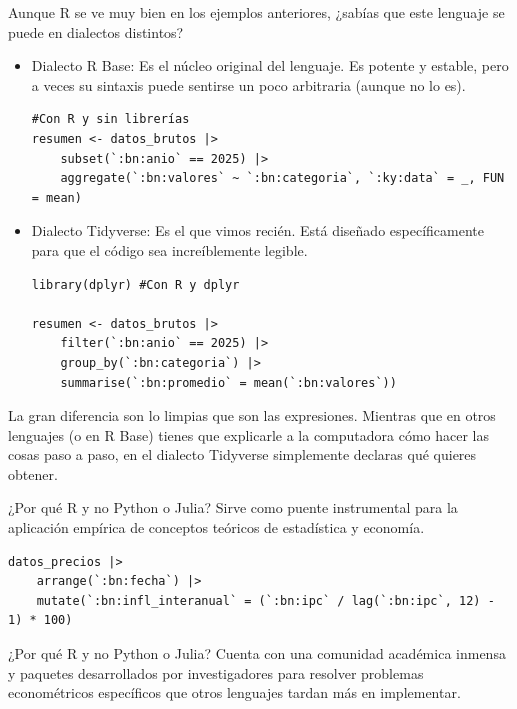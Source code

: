 \documentclass[8pt]{beamer}
\begin{document}
	
\begin{frame}[fragile]
Aunque R se ve muy bien en los ejemplos anteriores, ¿sabías que este lenguaje se puede  en dialectos distintos?

\begin{itemize}
	\item Dialecto R Base: Es el núcleo original del lenguaje. Es potente y estable, pero a veces su sintaxis puede sentirse un poco arbitraria (aunque no lo es).
\begin{lstlisting}[style=RScript]
#Con R y sin librerías
resumen <- datos_brutos |>
	subset(`:bn:anio` == 2025) |>
	aggregate(`:bn:valores` ~ `:bn:categoria`, `:ky:data` = _, FUN = mean)
\end{lstlisting}
	
	\item Dialecto Tidyverse: Es el que vimos recién. Está diseñado específicamente para que el código sea increíblemente legible.
	
\begin{lstlisting}[style=RScript]
library(dplyr) #Con R y dplyr

resumen <- datos_brutos |>
	filter(`:bn:anio` == 2025) |>
	group_by(`:bn:categoria`) |>
	summarise(`:bn:promedio` = mean(`:bn:valores`))
\end{lstlisting}		
\end{itemize}

La gran diferencia son lo limpias que son las expresiones. Mientras que en otros lenguajes (o en R Base) tienes que explicarle a la computadora cómo hacer las cosas paso a paso, en el dialecto Tidyverse simplemente declaras qué quieres obtener.
\end{frame}
	
	
	

	
	\begin{frame}[fragile]{¿Por qué R y no Python o Julia?}
		Sirve como puente instrumental para la aplicación empírica de conceptos teóricos de estadística y economía.
\begin{lstlisting}[style=RScript]
datos_precios |>
	arrange(`:bn:fecha`) |>
	mutate(`:bn:infl_interanual` = (`:bn:ipc` / lag(`:bn:ipc`, 12) - 1) * 100)
\end{lstlisting}
	\end{frame}
	
	
	\begin{frame}{¿Por qué R y no Python o Julia?}
			Cuenta con una comunidad académica inmensa y paquetes desarrollados por investigadores para resolver problemas econométricos específicos que otros lenguajes tardan más en implementar.
	\end{frame}
	
\end{document}
